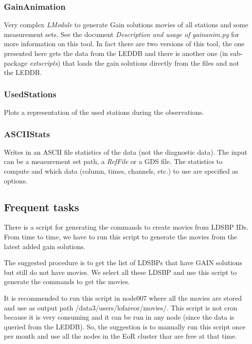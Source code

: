 \documentclass[a4paper,11pt]{article}
\begin{document}
\subsubsection*{GainAnimation}

Very complex \textit{LModule} to generate Gain solutions movies of all stations and some measurement sets. See the document \textit{Description and usage of gainanim.py} for more information on this tool.
In fact there are two versions of this tool, the one presented here gets the data from the LEDDB and there is another one (in sub-package \textit{extscripts}) that loads the gain solutions directly from the files and not the LEDDB. 

\subsubsection*{UsedStations}

Plots a representation of the used stations during the observations.

\subsubsection*{ASCIIStats}

Writes in an ASCII file statistics of the data (not the diagnostic data). The input can be a measurement set path, a \textit{RefFile} or a GDS file. 
The statistics to compute and which data (column, times, channels, etc.) to use are specified as options.

\subsection{Frequent tasks}

There is a script for generating the commands to create movies from LDSBP IDs. From time to time, we have to run this script to generate the movies from the latest added gain solutions.

The suggested procedure is to get the list of LDSBPs that have GAIN solutions but still do not have movies. We select all these LDSBP and use this script to generate the commands to get the movies.

It is recommended to run this script in node007 where all the movies are stored and use as output path /data3/users/lofareor/movies/. This script is not cron because it is very consuming and it can be run in any node (since the data is queried from the LEDDB). So, the suggestion is to manually run this script once per month and use all the nodes in the EoR cluster thar are free at that time.
\end{document}
